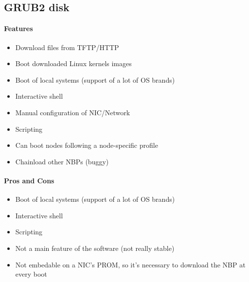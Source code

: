\documentclass[a4paper,11pt]{article}
\newcommand{\pro} {\item[$\oplus$]}
\newcommand{\con} {\item[$\ominus$]}
\begin{document}
\subsection{GRUB2 disk}
\paragraph{Features}
\begin{itemize}
  \item Download files from TFTP/HTTP
  \item Boot downloaded Linux kernels images
  \item Boot of local systems (support of a lot of OS brands)
  \item Interactive shell
  \item Manual configuration of NIC/Network
  \item Scripting
  \item Can boot nodes following a node-specific profile
  \item Chainload other NBPs (buggy)
\end{itemize}
\paragraph{Pros and Cons}
\begin{itemize}
  \pro Boot of local systems (support of a lot of OS brands)
  \pro Interactive shell
  \pro Scripting
  \con Not a main feature of the software (not really stable)
  \con Not embedable on a NIC's PROM, so it's necessary to download the NBP at every boot
\end{itemize}
\newpage
\end{document}

